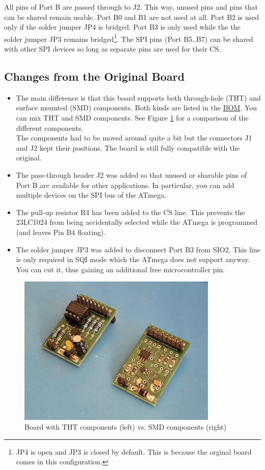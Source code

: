 \documentclass{article}
\newcommand{\CS}{$\overline{\mbox{CS}}$}
\begin{document}
All pins of Port B are passed through to J2. This way, unused pins and pins that can be shared remain usable. 
Port B0 and B1 are not used at all. Port B2 is used only if the solder jumper JP4 is bridged. Port B3 is only used while the the solder jumper JP3 remains bridged\footnote{JP4 is open and JP3 is closed by default. This is because the orginal board comes in this configuration.}. The SPI pins (Port B5..B7) can be shared with other SPI devices so long as separate pins are used for their \CS. 
\FloatBarrier

\subsection{Changes from the Original Board}\label{sec:differences}
\begin{itemize}
\item The main difference is that this board supports both through-hole (THT) and surface mounted (SMD) components. Both kinds are listed in the \href{../BOM/BOM.pdf}{BOM}. You can mix THT and SMD components. See Figure \ref{fig:thtSmd} for a comparison of the different components. \\
The components had to be moved around quite a bit but the connectors J1 and J2 kept their positions. The board is still fully compatible with the original. 
\item The pass-through header J2 was added so that unused or sharable pins of Port B are available for other applications. In particular, you can add multiple devices on the SPI bus of the ATmega. 
\item The pull-up resistor R4 has been added to the \CS{} line. This prevents the 23LC1024 from being accidentally selected while the ATmega is programmed (and leaves Pin B4 floating). 
\item The solder jumper JP3 was added to disconnect Port B3 from SIO2. This line is only required in SQI mode which the ATmega does not support anyway. You can cut it, thus gaining an additional free microcontroller pin. 
\end{itemize}

\begin{figure}[htb]
\centering
\includegraphics[width=0.85\textwidth]{Pictures/THTSMD.jpg}
\caption{Board with THT components (left) vs. SMD components (right)}
\label{fig:thtSmd}
\end{figure}
\end{document}
